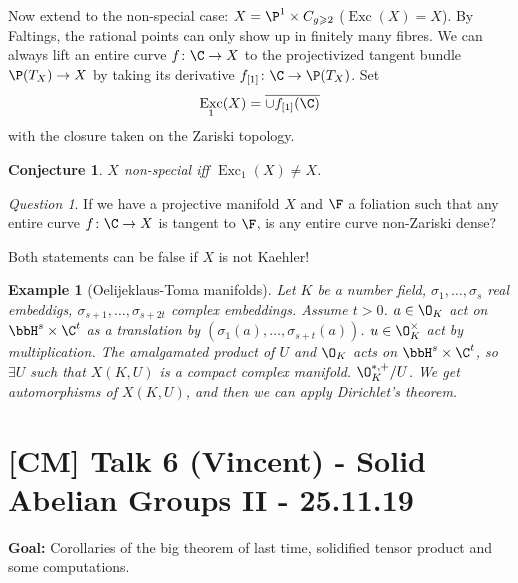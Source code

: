 \documentclass[A4paper, british]{amsart}
\theoremstyle{darkgreentheorem}
\newtheorem{conj}[thm]{Conjecture}
\theoremstyle{darkbluedefinition}
\theoremstyle{darkredexample}
\newtheorem{exa}[thm]{Example}
\theoremstyle{remark}
\newtheorem{q}[thm]{Question}
\DeclareMathOperator{\Exc}{Exc}
\newcommand{\1}{\mathbbm{1}}
\newcommand{\db}{\marginnote{\dbend}}
\newcommand{\tms}{\times}
\begin{document}
Now extend to the non-special case: $X=\P^{1}\tms C_{g\geqslant 2}$ ($\Exc(X)=X$).
By Faltings, the rational points can only show up in finitely many fibres.
We can always lift an entire curve $f\colon \C\to X$ to the projectivized tangent bundle $\P(T_{X})\to X$ by taking its derivative $f_{[1]}\colon \C\to \P(T_{X})$.
Set
\[ \Exc_{1}(X)=\overline{\cup f_{[1]}(\C)} \]
with the closure taken on the Zariski topology.

\begin{conj}
    $X$ non-special iff $\Exc_{1}(X)\neq X$.
\end{conj}

\begin{q}
    If we have a projective manifold $X$ and $\F$ a foliation such that any entire curve $f\colon \C\to X$ is tangent to $\F$, is any entire curve non-Zariski dense?
\end{q}

\db Both statements can be false if $X$ is not Kaehler!

\begin{exa}[Oelijeklaus-Toma manifolds]
    Let $K$ be a number field, $\sigma_{1},\ldots,\sigma_{s}$ real embeddigs, $\sigma_{s+1},\ldots, \sigma_{s+2t}$ complex embeddings.
    Assume $t>0$.
    $a\in \O_{K}$ act on $\bbH^{s}\tms \C^{t}$ as a translation by $(\sigma_{1}(a),\ldots,\sigma_{s+t}(a))$.
    $u\in \O_{K}^{\tms}$ act by multiplication.
    The amalgamated product of $U$ and $\O_{K}$ acts on $\bbH^{s}\tms \C^{t}$, so $\exists U$ such that $X(K,U)$ is a compact complex manifold.
    $\O_{K}^{*,+}/U$.
    We get automorphisms of $X(K,U)$, and then we can apply Dirichlet's theorem.
\end{exa}

\section{[CM] Talk 6 (Vincent) - Solid Abelian Groups II - 25.11.19}

\textbf{Goal:} Corollaries of the big theorem of last time, solidified tensor product and some computations.
\end{document}
